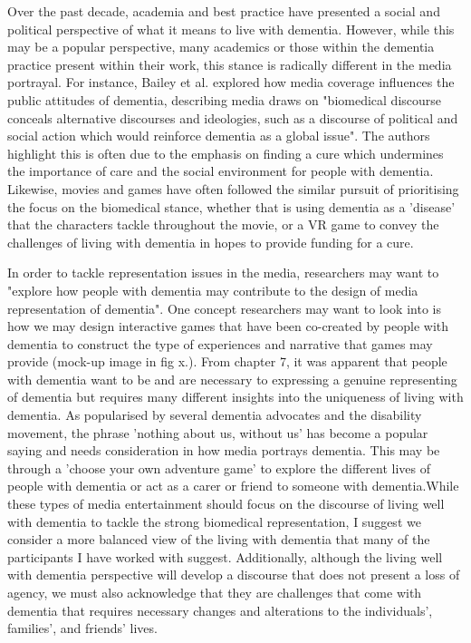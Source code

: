 Over the past decade, academia and best practice have presented a social and political perspective of what it means to live with dementia. However, while this may be a popular perspective, many academics or those within the dementia practice present within their work, this stance is radically different in the media portrayal. For instance, Bailey et al. explored how media coverage influences the public attitudes of dementia, describing media draws on "biomedical discourse conceals alternative discourses and ideologies, such as a discourse of political and social action which would reinforce dementia as a global issue". The authors highlight this is often due to the emphasis on finding a cure which undermines the importance of care and the social environment for people with dementia. Likewise, movies and games have often followed the similar pursuit of prioritising the focus on the biomedical stance, whether that is using dementia as a 'disease' that the characters tackle throughout the movie, or a VR game to convey the challenges of living with dementia in hopes to provide funding for a cure.

In order to tackle representation issues in the media, researchers may want to "explore how people with dementia may contribute to the design of media representation of dementia". One concept researchers may want to look into is how we may design interactive games that have been co-created by people with dementia to construct the type of experiences and narrative that games may provide (mock-up image in fig x.). From chapter 7, it was apparent that people with dementia want to be and are necessary to expressing a genuine representing of dementia but requires many different insights into the uniqueness of living with dementia. As popularised by several dementia advocates and the disability movement, the phrase 'nothing about us, without us' has become a popular saying and needs consideration in how media portrays dementia. This may be through a 'choose your own adventure game' to explore the different lives of people with dementia or act as a carer or friend to someone with dementia.While these types of media entertainment should focus on the discourse of living well with dementia to tackle the strong biomedical representation, I suggest we consider a more balanced view of the living with dementia that many of the participants I have worked with suggest. Additionally, although the living well with dementia perspective will develop a discourse that does not present a loss of agency, we must also acknowledge that they are challenges that come with dementia that requires necessary changes and alterations to the individuals', families', and friends' lives. 


